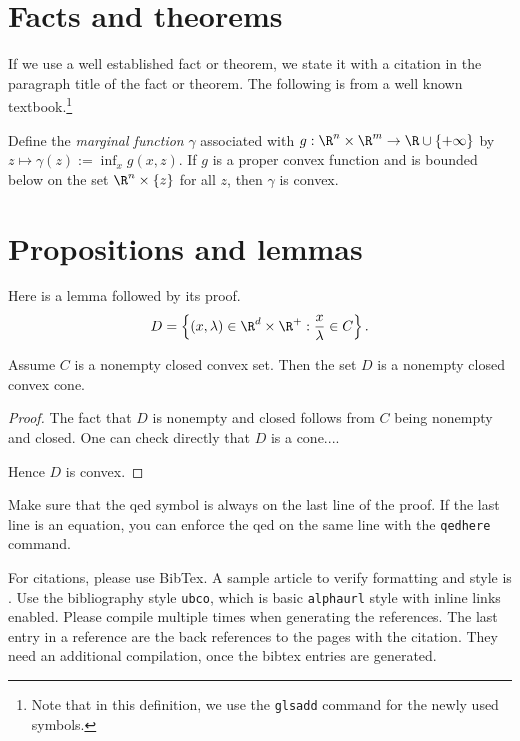 \section{Facts and theorems}
If we use a well established fact or theorem, we state it with a citation in the paragraph title of the fact or theorem. The following is from a well known textbook.\footnote{Note that in this definition, we use the \texttt{glsadd} command for the newly used symbols.}

\begin{fact}\cite[Theorem~IV.2.4.2]{Hiriart-Urruty:1993-ConvexAnalysis}\label{def:marginalfunc}
Define the \emph{marginal function} $\gamma$ associated with $g:\R^n\times\R^m\rightarrow \R\cup
\{+\infty\}$ by $z\mapsto \gamma(z):=\inf_x
g(x,z)$. If $g$ is a proper convex function and is bounded below on the set  $\R^n \times \{z\}$ for all $z$, then $\gamma$ is convex.
\end{fact}

\section{Propositions and lemmas}
Here is a lemma followed by its proof.
\[
D =\left\{ (x,\lambda)\in \R^d \times \R^+ : \frac{x}{\lambda} \in C\right\}.
\]


\begin{lemma}
Assume $C$ is a nonempty closed convex set. Then the set $D$ is a nonempty closed convex cone.
\end{lemma}

\begin{proof}
The fact that $D$ is nonempty and closed follows from $C$ being non\-empty and closed. One can check directly that $D$ is a cone....

Hence $D$ is convex.
\end{proof}
Make sure that the qed symbol is always on the last line of the proof. If the last line is an equation, you can enforce the qed on the same line with the \texttt{qedhere} command.

For citations, please use BibTex. A sample article to verify formatting and style is \cite{Bauschke:2007-PA02}. Use the bibliography style \texttt{ubco}, which is basic \texttt{alphaurl} style with inline links enabled. Please compile multiple times when generating the references. The last entry in a reference are the back references to the pages with the citation. They need an additional compilation, once the bibtex entries are generated.

